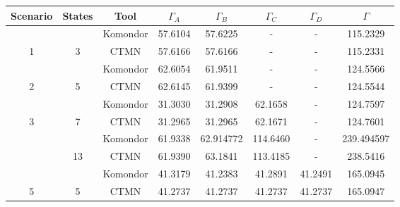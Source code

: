 \documentclass[a4paper]{article}
\begin{document}
	\begin{table}[]
		\centering
		\begin{tabular}{|c|c|c|c|c|c|c|c|}
			\hline
			\textbf{Scenario}                           & \textbf{States}                              & \textbf{Tool} & $\Gamma_A$ & $\Gamma_B$ & $\Gamma_C$ & $\Gamma_D$ & $\Gamma$   \\ \hline
			                                            &                                              & Komondor       & 57.6104    & 57.6225    & -          & -          & 115.2329   \\ \cline{3-8} 
			\multirow{-2}{*}{1}                         & \multirow{-2}{*}{3}                          & CTMN          & 57.6166    & 57.6166    & -          & -          & 115.2331   \\ \hline
			                                            &                                              & Komondor       & 62.6054    & 61.9511    & -          & -          & 124.5566   \\ \cline{3-8} 
			\multirow{-2}{*}{2}                         & \multirow{-2}{*}{5}                          & CTMN          & 62.6145    & 61.9399    & -          & -          & 124.5544   \\ \hline
			                                            &                                              & Komondor       & 31.3030    & 31.2908    & 62.1658    & -          & 124.7597   \\ \cline{3-8} 
			\multirow{-2}{*}{3}                         & \multirow{-2}{*}{7}                          & CTMN          & 31.2965    & 31.2965    & 62.1671    & -          & 124.7601   \\ \hline
			\rowcolor[HTML]{FFCCC9} 
			\cellcolor[HTML]{FFCCC9}                    & \cellcolor[HTML]{FFCCC9}                     & Komondor       & 61.9338    & 62.914772  & 114.6460   & -          & 239.494597 \\ \cline{3-8} 
			\rowcolor[HTML]{FFCCC9} 
			\multirow{-2}{*}{\cellcolor[HTML]{FFCCC9}4} & \multirow{-2}{*}{\cellcolor[HTML]{FFCCC9}13} & CTMN          & 61.9390    & 63.1841    & 113.4185   & -          & 238.5416   \\ \hline
			                                            &                                              & Komondor       & 41.3179    & 41.2383    & 41.2891    & 41.2491    & 165.0945   \\ \cline{3-8} 
			\multirow{-2}{*}{5}                         & \multirow{-2}{*}{5}                          & CTMN          & 41.2737    & 41.2737    & 41.2737    & 41.2737    & 165.0947   \\ \hline

\end{tabular}
\end{table}
\end{document}
